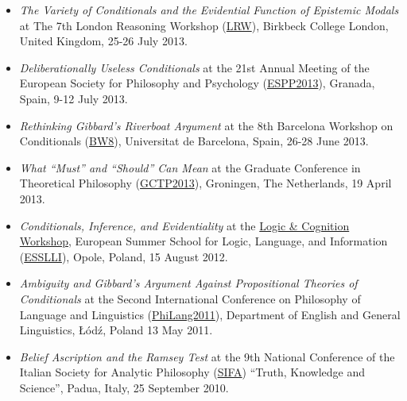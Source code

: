 \documentclass[a4paper,12pt]{article}
\begin{document}
\begin{small}
\begin{itemize}
    \item \emph{The Variety of Conditionals and the Evidential Function of Epistemic Modals} at The 7th London Reasoning Workshop (\href{http://www.bbk.ac.uk/psychology/about-us/events/the-7th-london-reasoning-workshop}{LRW}), Birkbeck College London, United Kingdom, 25-26 July 2013.

    \item \emph{Deliberationally Useless Conditionals} at the 21st Annual Meeting of the European Society for Philosophy and Psychology (\href{http://espp2013.com}{ESPP2013}), Granada, Spain, 9-12 July 2013.

    \item \emph{Rethinking Gibbard’s Riverboat Argument} at the 8th Barcelona Workshop on Conditionals
    (\href{http://www.ub.edu/logosbw/bw8/index.html}{BW8}), Universitat de Barcelona, Spain, 26-28 June 2013.
    
    \item \emph{What ``Must'' and ``Should'' Can Mean} at the Graduate Conference in Theoretical Philosophy
    (\href{http://www.philos.rug.nl/GCTP2013/}{GCTP2013}), Groningen, The Netherlands, 19 April 2013. 
    
    \item \emph{Conditionals, Inference, and Evidentiality} at the \href{http://www.ai.rug.nl/SocialCognition/logic-cognition/}{Logic \& Cognition Workshop}, European Summer School for Logic, Language, and Information (\href{http://www.esslli2012.pl}{ESSLLI}), Opole, Poland, 15 August 2012. 

    \item \emph{Ambiguity and Gibbard's Argument Against Propositional Theories of Conditionals} at the Second International Conference on Philosophy of Language and Linguistics (\href{http://ia.uni.lodz.pl/linguistics/events/philang-2011}{PhiLang2011}),  Department of English and General Linguistics, Łódź, Poland
    13 May 2011. 

    \item \emph{Belief Ascription and the Ramsey Test} at the 9th National Conference of the Italian Society for Analytic Philosophy (\href{http://www.filosofia.lettere.unipd.it/analitica/sifa2010/}{SIFA}) ``Truth, Knowledge and Science'', Padua, Italy, 25 September 2010. 
  

\end{itemize}
\end{small}
\end{document}
